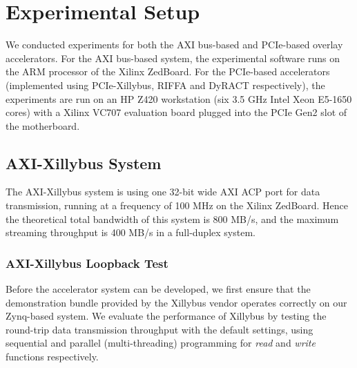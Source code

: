 \section{Experimental Setup}
\label{section_5}
We conducted experiments for both the AXI bus-based and PCIe-based overlay accelerators.  
For the AXI bus-based system, the experimental software runs on the ARM processor of the Xilinx ZedBoard. 
For the PCIe-based accelerators (implemented using PCIe-Xillybus, RIFFA and DyRACT respectively), the experiments are run on an HP Z420 workstation (six 3.5 GHz Intel Xeon E5-1650 cores) with a Xilinx VC707 evaluation board plugged into the PCIe Gen2 slot of the motherboard. 

\subsection{AXI-Xillybus System}
The AXI-Xillybus system is using one 32-bit wide AXI ACP port for data transmission, running at a frequency of 100 MHz on the Xilinx ZedBoard. 
Hence the theoretical total bandwidth of this system is 800 MB/s, and the maximum streaming throughput is 400 MB/s in a full-duplex system. 

\subsubsection{AXI-Xillybus Loopback Test}
Before the accelerator system can be developed, we first ensure that the demonstration bundle provided by the Xillybus vendor operates correctly on our Zynq-based system. 
We evaluate the performance of Xillybus by testing the round-trip data transmission throughput with the default settings, using sequential and parallel (multi-threading) programming for \textit{read} and \textit{write} functions respectively. 

